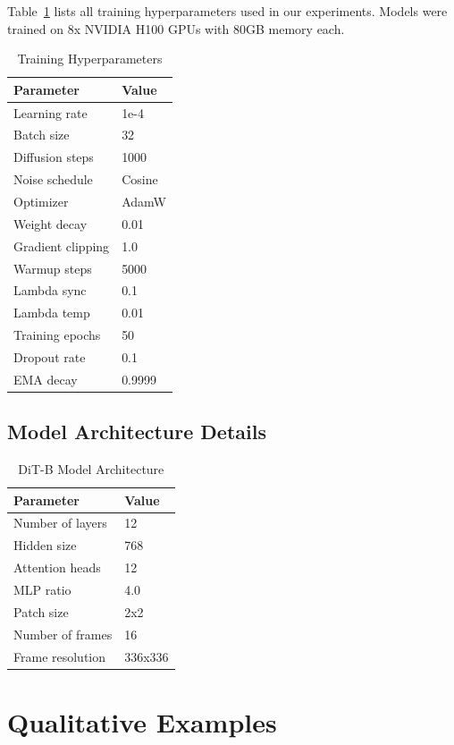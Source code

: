 \documentclass[journal]{IEEEtran}
\theoremstyle{definition}
\theoremstyle{remark}
\begin{document}
Table~\ref{tab:hyperparams} lists all training hyperparameters used in our experiments. Models were trained on 8x NVIDIA H100 GPUs with 80GB memory each.

\begin{table}[!ht]
\centering
\caption{Training Hyperparameters}
\label{tab:hyperparams}
\begin{tabular}{ll}
\toprule
Parameter & Value \\
\midrule
Learning rate & 1e-4 \\
Batch size & 32 \\
Diffusion steps & 1000 \\
Noise schedule & Cosine \\
Optimizer & AdamW \\
Weight decay & 0.01 \\
Gradient clipping & 1.0 \\
Warmup steps & 5000 \\
Lambda sync & 0.1 \\
Lambda temp & 0.01 \\
Training epochs & 50 \\
Dropout rate & 0.1 \\
EMA decay & 0.9999 \\
\bottomrule
\end{tabular}
\end{table}

\subsection{Model Architecture Details}

\begin{table}[H]
\centering
\caption{DiT-B Model Architecture}
\label{tab:architecture}
\begin{tabular}{ll}
\toprule
Parameter & Value \\
\midrule
Number of layers & 12 \\
Hidden size & 768 \\
Attention heads & 12 \\
MLP ratio & 4.0 \\
Patch size & 2x2 \\
Number of frames & 16 \\
Frame resolution & 336x336 \\
\bottomrule
\end{tabular}
\end{table}

\section{Qualitative Examples}
\label{app:f}
\end{document}
